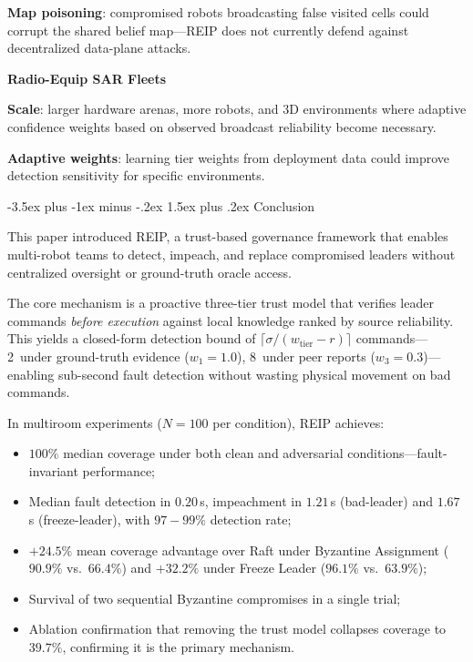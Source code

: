 \documentclass[conference]{IEEEtran}
\makeatletter
\renewcommand{\section}{\@startsection{section}{1}{\z@}%
  {-3.5ex plus -1ex minus -.2ex}%
  {1.5ex plus .2ex}%
  {\normalfont\large\bfseries\centering}}
\makeatother
\begin{document}
\textbf{Map poisoning}: compromised robots broadcasting false visited cells could corrupt the shared belief map---REIP does not currently defend against decentralized data-plane attacks.

\textbf{Radio-Equip SAR Fleets}

\textbf{Scale}: larger hardware arenas, more robots, and 3D environments where adaptive confidence weights based on observed broadcast reliability become necessary.

\textbf{Adaptive weights}: learning tier weights from deployment data could improve detection sensitivity for specific environments.

\section{Conclusion}
\label{sec:conclusion}

This paper introduced REIP, a trust-based governance framework that enables multi-robot teams to detect, impeach, and replace compromised leaders without centralized oversight or ground-truth oracle access.

The core mechanism is a proactive three-tier trust model that verifies leader commands \emph{before execution} against local knowledge ranked by source reliability. This yields a closed-form detection bound of $\lceil \sigma / (w_{\text{tier}} - r) \rceil$ commands---2~under ground-truth evidence ($w_1{=}1.0$), 8~under peer reports ($w_3{=}0.3$)---enabling sub-second fault detection without wasting physical movement on bad commands.

In multiroom experiments ($N{=}100$ per condition), REIP achieves:
\begin{itemize}
    \item $100\%$ median coverage under both clean and adversarial conditions---fault-invariant performance;
    \item Median fault detection in $0.20\,$s, impeachment in $1.21\,$s (bad-leader) and $1.67\,$s (freeze-leader), with $97{-}99\%$ detection rate;
    \item $+24.5\%$ mean coverage advantage over Raft under Byzantine Assignment ($90.9\%$ vs.\ $66.4\%$) and $+32.2\%$ under Freeze Leader ($96.1\%$ vs.\ $63.9\%$);
    \item Survival of two sequential Byzantine compromises in a single trial;
    \item Ablation confirmation that removing the trust model collapses coverage to $39.7\%$, confirming it is the primary mechanism.
\end{itemize}
\end{document}
